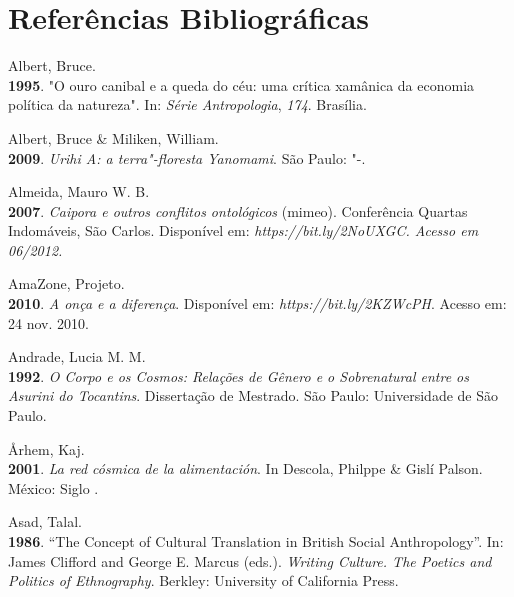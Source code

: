 
\chapter{Referências
Bibliográficas}\label{referuxeancias-bibliogruxe1ficas}


\begin{Parskip}
Albert, Bruce.\\
\textbf{1995}. "O ouro canibal e a queda do céu: uma crítica xamânica da
economia política da natureza". In: \emph{Série Antropologia},
\emph{174}. Brasília.

Albert, Bruce \& Miliken, William.\\
\textbf{2009}. \emph{Urihi A: a terra"-floresta Yanomami}. São Paulo:
"-.

Almeida, Mauro W. B.\\
\textbf{2007}. \emph{Caipora e outros conflitos ontológicos} (mimeo).
Conferência Quartas Indomáveis, São Carlos. Disponível em:
\emph{https://bit.ly/2NoUXGC. Acesso em 06/2012.}

AmaZone, Projeto.\\
\textbf{2010}. \emph{A onça e a diferença}. Disponível em:
\emph{https://bit.ly/2KZWcPH}.
Acesso em: 24 nov. 2010.

Andrade, Lucia M. M.\\
\textbf{1992}. \emph{O Corpo e os Cosmos: Relações de Gênero e o
Sobrenatural entre os Asurini do Tocantins}. Dissertação de Mestrado.
São Paulo: Universidade de São Paulo.

Århem, Kaj.\\
\textbf{2001}. \emph{La red cósmica de la alimentación}. In Descola,
Philppe \& Gislí Palson. México: Siglo .

Asad, Talal.\\
\textbf{1986}. ``The Concept of Cultural Translation in British Social
Anthropology''. In: James Clifford and George E. Marcus (eds.).
\emph{Writing Culture. The Poetics and Politics of Ethnography}.
Berkley: University of California Press.


\end{Parskip}
